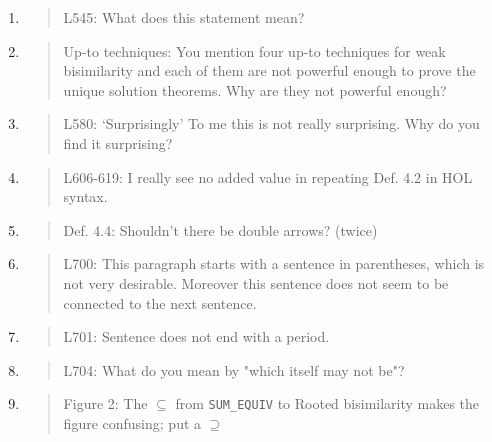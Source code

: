 \begin{enumerate}
\item \begin{quote}
    L545: What does this statement mean?
  \end{quote}

\item \begin{quote}
    Up-to techniques: You mention four up-to techniques for weak
    bisimilarity and each of them are not powerful enough to prove the
    unique solution theorems. Why are they not powerful enough?
  \end{quote}

\item \begin{quote}
    L580: ‘Surprisingly’ To me this is not really surprising. Why do you find it surprising?
  \end{quote}

\item \begin{quote}
    L606-619: I really see no added value in repeating Def. 4.2 in HOL syntax.
  \end{quote}

\item \begin{quote}
    Def. 4.4: Shouldn’t there be double arrows? (twice)
  \end{quote}

\item \begin{quote}
    L700: This paragraph starts with a sentence in parentheses, which is not very desirable.
    Moreover this sentence does not seem to be connected to the next sentence.
  \end{quote}

\item \begin{quote}
    L701: Sentence does not end with a period.
  \end{quote}

\item \begin{quote}
    L704: What do you mean by "which itself may not be"?
  \end{quote}

\item \begin{quote}
    Figure 2: The $\subseteq$ from \texttt{SUM\_EQUIV} to Rooted
    bisimilarity makes the figure confusing; put a $\supseteq$
  \end{quote}


\end{enumerate}
